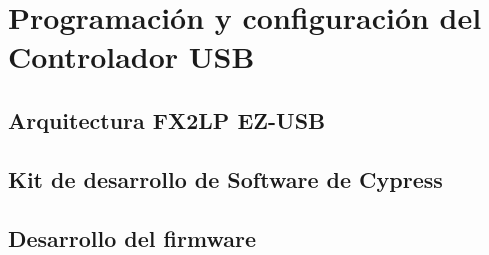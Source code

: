 \chapter{Programación y configuración del Controlador USB}
	\label{cap:cy}
	\section{Arquitectura FX2LP EZ-USB}
		
	\section{Kit de desarrollo de Software de Cypress}
		
	\section{Desarrollo del firmware}
		